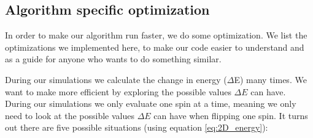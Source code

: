 \documentclass[reprint, english,notitlepage,nofootinbib]{revtex4-1}  %
\begin{document}
\subsection{Algorithm specific optimization}

In order to make our algorithm run faster, we do some optimization. We list the optimizations we implemented here, to make our code easier to understand and as a guide for anyone who wants to do something similar.

During our simulations we calculate the change in energy ($\Delta$E) many times. We want to make more efficient by exploring the possible values $\Delta E$ can have. During our simulations we only evaluate one spin at a time, meaning we only need to look at the possible values $\Delta E$ can have when flipping one spin. It turns out there are five possible situations (using equation \eqref{eq:2D_energy}):
\end{document}
